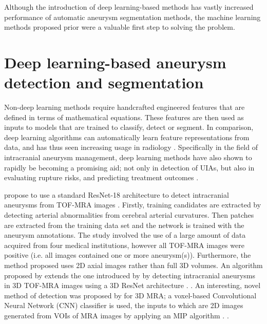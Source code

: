 Although the introduction of deep learning-based methods has vastly increased performance of automatic aneurysm segmentation methods, the machine learning methods proposed prior were a valuable first step to solving the problem. 

\section{Deep learning-based aneurysm detection and segmentation}
Non-deep learning methods require handcrafted engineered features that are defined in terms of mathematical equations. These features are then used as inputs to models that are trained to classify, detect or segment. In comparison, deep learning algorithms can automatically learn feature representations from data, and has thus seen increasing usage in radiology \cite{Hosny2018}. Specifically in the field of intracranial aneurysm management, deep learning methods have also shown to rapidly be becoming a promising aid; not only in detection of UIAs, but also in evaluating rupture risks, and predicting treatment outcomes \cite{Shi2020}.

\citeauthor{Ueda2019} propose to use a standard ResNet-18 architecture to detect intracranial aneurysms from TOF-MRA images \cite{He2016, Ueda2019}. Firstly, training candidates are extracted by detecting arterial abnormalities from cerebral arterial curvatures. Then patches are extracted from the training data set and the network is trained with the aneurysm annotations. The study involved the use of a large amount of data acquired from four medical institutions, however all TOF-MRA images were positive (i.e. all images contained one or more aneurysm(s)). Furthermore, the method proposed uses 2D axial images rather than full 3D volumes. An algorithm proposed by \citeauthor{Joo2020} extends the one introduced by \citeauthor{Ueda2019} by detecting intracranial aneurysms in 3D TOF-MRA images using a 3D ResNet architecture \cite{He2016, Joo2020}. . An interesting, novel method of detection was proposed by \citeauthor{Nakao2018} for 3D MRA; a voxel-based Convolutional Neural Network (CNN) classifier is used, the inputs to which are 2D images generated from VOIs of MRA images by applying an MIP algorithm \cite{Nakao2018}. .  

